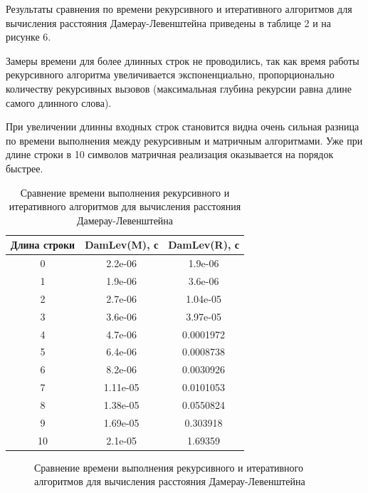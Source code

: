 \documentclass[14pt]{report}
\begin{document}
Результаты сравнения по времени рекурсивного и итеративного алгоритмов для вычисления расстояния Дамерау-Левенштейна приведены в таблице 2 и на рисунке 6.

Замеры времени для более длинных строк не проводились, так как время работы рекурсивного алгоритма увеличивается экспоненциально, пропорционально количеству рекурсивных вызовов (максимальная глубина рекурсии равна длине самого длинного слова).

При увеличении длинны входных строк становится видна очень сильная разница по времени выполнения между рекурсивным и матричным алгоритмами. Уже при длине строки в 10 символов матричная реализация оказывается на порядок быстрее.

\begin{table}
	\caption{Сравнение времени выполнения рекурсивного и итеративного алгоритмов для вычисления расстояния Дамерау-Левенштейна}
		\begin{tabular}{|c | c | c |}
	 	\hline
		Длина строки & DamLev(M), с & DamLev(R), с \\ [0.5ex]
	 	\hline\hline
		0 & 2.2e-06 & 1.9e-06 \\
		\hline
		1 & 1.9e-06 & 3.6e-06 \\
		\hline
		2 & 2.7e-06 & 1.04e-05 \\
		\hline
		3 & 3.6e-06 & 3.97e-05 \\
		\hline
		4 & 4.7e-06 & 0.0001972 \\
		\hline
		5 & 6.4e-06 & 0.0008738 \\
		\hline
		6 & 8.2e-06 & 0.0030926 \\
		\hline
		7 & 1.11e-05 & 0.0101053 \\
		\hline
		8 & 1.38e-05 & 0.0550824 \\
		\hline
		9 & 1.69e-05 & 0.303918 \\
		\hline
		10 & 2.1e-05 & 1.69359 \\
		\hline

		\end{tabular}
\end{table}

\begin{figure}
	\caption{Сравнение времени выполнения рекурсивного и итеративного алгоритмов для вычисления расстояния Дамерау-Левенштейна}
\end{figure}
\end{document}
